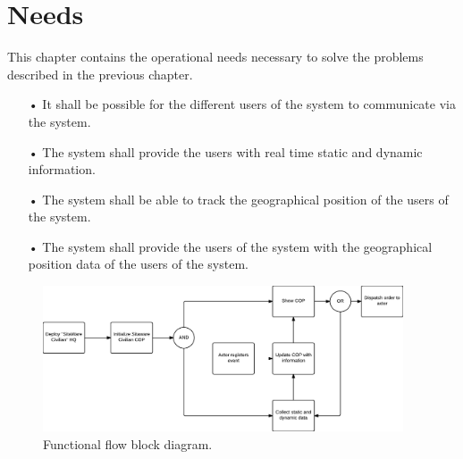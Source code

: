 \chapter{Needs}
This chapter contains the operational needs necessary to solve the problems described in the previous chapter. 



\begin{enumerate}
\item[•] It shall be possible for the different users of the system to communicate via the system. 
\item[•] The system shall provide the users with real time static and dynamic information. 
\item[•] The system shall be able to track the geographical position of the users of the system. 
\item[•] The system shall provide the users of the system with the geographical position data of the users of the system. 
\end{enumerate}




\begin{figure}[H]
\centering
\includegraphics[width=0.95\textwidth]
{billeder/functional_flow_block_diagram.pdf}
\caption{Functional flow block diagram.}
\label{fig:functional_flow_block_diagram}
\end{figure}